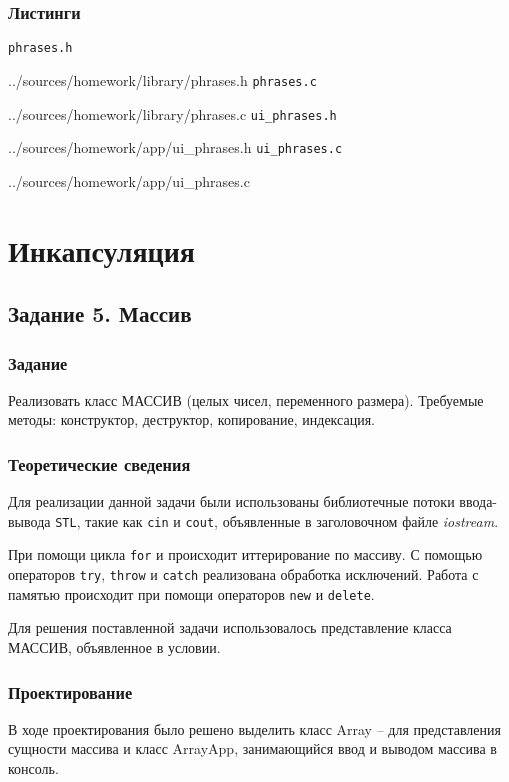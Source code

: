 \documentclass[12pt,a4paper]{report}
\begin{document}
\newpage
\subsection{Листинги}
\verb+phrases.h+

{../sources/homework/library/phrases.h}
\verb+phrases.c+

{../sources/homework/library/phrases.c}
\verb+ui_phrases.h+

{../sources/homework/app/ui_phrases.h}
\verb+ui_phrases.c+

{../sources/homework/app/ui_phrases.c}





\newpage



\chapter{Инкапсуляция}
\section{Задание 5. Массив}
\subsection{Задание}

\hspace{\parindent}Реализовать класс МАССИВ (целых чисел, переменного размера). Требуемые методы: конструктор, деструктор, копирование, индексация. 

\subsection{Теоретические сведения}
\hspace{\parindent}Для реализации данной задачи были использованы библиотечные потоки ввода-вывода \verb+STL+, такие как \verb+cin+ и \verb+cout+, объявленные в заголовочном файле \textit{iostream}.

При помощи цикла \verb+for+ и происходит иттерирование по массиву. С помощью операторов \verb+try+, \verb+throw+ и \verb+catch+ реализована обработка исключений. Работа с памятью происходит при помощи операторов \verb+new+ и \verb+delete+.

Для решения поставленной задачи использовалось представление класса МАССИВ, объявленное в условии.

\subsection{Проектирование}
\hspace{\parindent}В ходе проектирования было решено выделить класс Array -- для представления сущности массива и класс ArrayApp, занимающийся ввод и выводом массива в консоль.
\end{document}
